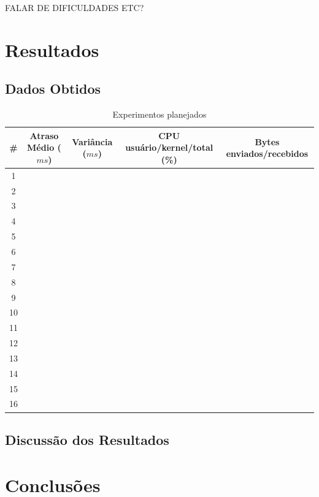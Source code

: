 \documentclass[12pt]{article}
\begin{document}
FALAR DE DIFICULDADES ETC?

\section{Resultados} \label{sec:resultados}
\subsection{Dados Obtidos} \label{sub:dados}

\begin{table}
  \center
  \footnotesize
  \begin{tabular}{|c|c|c|c|c|}
  \hline
    \# & \textbf{Atraso Médio ($ms$)} & \textbf{Variância ($ms$)} & \textbf{CPU usuário/kernel/total (\%)} & \textbf{Bytes enviados/recebidos} \\ \hline
    1 &  &  &  &  \\ \hline
    2 &  &  &  &  \\ \hline
    3 &  &  &  &  \\ \hline
    4 &  &  &  &  \\ \hline
    5 &  &  &  &  \\ \hline
    6 &  &  &  &  \\ \hline
    7 &  &  &  &  \\ \hline
    8 &  &  &  &  \\ \hline
    9 &  &  &  &  \\ \hline
    10 &  &  &  &  \\ \hline
    11 &  &  &  &  \\ \hline
    12 &  &  &  &  \\ \hline
    13 &  &  &  &  \\ \hline
    14 &  &  &  &  \\ \hline
    15 &  &  &  &  \\ \hline
    16 &  &  &  &  \\ \hline
  \end{tabular} 
\caption{Experimentos planejados}
\label{tab:experimentos}
\end{table} 

\subsection{Discussão dos Resultados} \label{sub:discussao}
\section{Conclusões} \label{sec:conclusoes}




\end{document}
